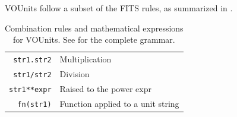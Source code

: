 \documentclass[11pt,a4paper]{ivoa}
\newcommand{\unit}[1]{\texttt{\small\color{orange}#1}}
\begin{document}
VOUnits follow a subset of the FITS rules,
as summarized in .

\begin{table}%
\begin{center}
\def\arraystretch{1.2}
\begin{tabular}{|r|l|}
\hline
\unit{str1.str2} & Multiplication \\
\unit{str1/str2} & Division \\
\unit{str1**expr} & Raised to the power expr \\
\unit{fn(str1)} & Function applied to a unit string\\
\hline
\end{tabular}
\end{center}
 \caption[Combination rules and mathematical expressions for VOUnits]
{\label{tab:VOUnitCombine}Combination rules and mathematical expressions for VOUnits.
See  for the complete grammar.}
\end{table}
\end{document}
